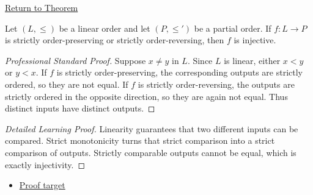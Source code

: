 \newpage
{}
\label{prf:strict-monotone-injective-linear}

\begin{remark*}[Return]
\hyperref[thm:strict-monotone-injective-linear]{Return to Theorem}
\end{remark*}

\begin{theorem*}
Let $(L,\leq)$ be a linear order and let $(P,\leq')$ be a partial order.
If $f:L\to P$ is strictly order-preserving or strictly order-reversing, then
$f$ is injective.
\end{theorem*}

\begin{proof}[Professional Standard Proof]
\LRAProofBodyStart
Suppose $x\neq y$ in $L$. Since $L$ is linear, either $x<y$ or $y<x$.
If $f$ is strictly order-preserving, the corresponding outputs are strictly
ordered, so they are not equal. If $f$ is strictly order-reversing, the outputs
are strictly ordered in the opposite direction, so they are again not equal.
Thus distinct inputs have distinct outputs.
\end{proof}

\begin{proof}[Detailed Learning Proof]
\LRAProofBodyStart
Linearity guarantees that two different inputs can be compared. Strict
monotonicity turns that strict comparison into a strict comparison of outputs.
Strictly comparable outputs cannot be equal, which is exactly injectivity.
\end{proof}
\begin{remark*}
\end{remark*}



\begin{dependencies}
\begin{itemize}
  \item \hyperref[thm:strict-monotone-injective-linear]{Proof target}
\end{itemize}
\end{dependencies}

\clearpage

